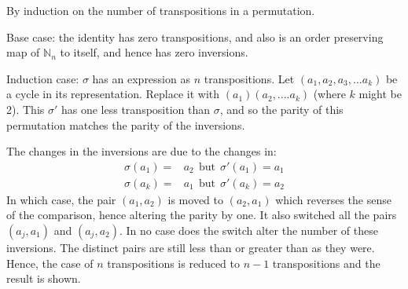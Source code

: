 \documentclass[11pt,oneside]{article}
\numberwithin{equation}{section}
\theoremstyle{definition}
\newtheorem{exercise}{Exercise}
\def\NN{\mathbb{N}}
\begin{document}
\begin{solution}
  By induction on the number of transpositions in a permutation.

  Base case: the identity has zero transpositions, and also is an
  order preserving map of $\NN_n$ to itself, and hence has zero
  inversions.

  Induction case: $\sigma$ has an expression as $n$
  transpositions. Let $(a _ 1, a_2, a_3, ... a_k)$ be a cycle in its
  representation. Replace it with $(a_1) (a_2,. ... a_k)$ (where $k$
  might be 2).  This $ \sigma ' $ has one less transposition than $\sigma$, and so the parity
  of this permutation matches the parity of the inversions.

  The changes in the inversions are due to the changes in:
  \begin{align*}
    \sigma ( a_1 ) = & a_2  \ \ \text{but} \ \  \sigma ' (a_1) = a_1 \\
    \sigma ( a_k) = & a_1 \ \ \text{but} \ \ \sigma ' (a_k) = a_2
  \end{align*}
  In which case, the pair $(a_1, a_2) $ is moved to $(a_2, a_1)$ which
  reverses the sense of the comparison, hence altering the parity by
  one.  It also switched all the pairs $(a_j, a_1)$ and $(a_j, a_2)$.
  In no case does the switch alter the number of these inversions. The
  distinct pairs are still less than or greater than as they
  were. Hence, the case of $n$ transpositions is reduced to $n-1$
  transpositions and the result is shown.  
\end{solution}

\begin{comment}
  \begin{exercise}
    problem
  \end{exercise}
  \begin{solution}
    \begin{enumerate}[(a)]
    \item
      first answer
    \end{enumerate}
  \end{solution}
\end{comment}
\end{document}
